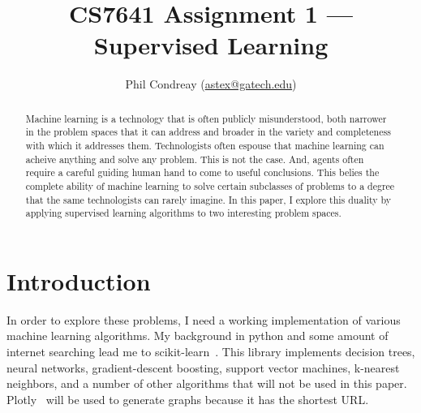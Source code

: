 \documentclass{article}
\title{CS7641 Assignment 1 --- Supervised Learning}
\author{Phil Condreay (\href{mailto:astex@gatech.edu}{astex@gatech.edu})}
\begin{document}
  \maketitle

  \begin{abstract}

    Machine learning is a technology that is often publicly misunderstood,
    both narrower in the problem spaces that it can address and broader in the
    variety and completeness with which it addresses them. Technologists often
    espouse that machine learning can acheive anything and solve any problem.
    This is not the case. And, agents often require a careful guiding human
    hand to come to useful conclusions. This belies the complete ability of
    machine learning to solve certain subclasses of problems to a degree that
    the same technologists can rarely imagine. In this paper, I explore this
    duality by applying supervised learning algorithms to two interesting
    problem spaces.

  \end{abstract}

  \section*{Introduction}\label{s:intro}

  In order to explore these problems, I need a working implementation of
  various machine learning algorithms. My background in python and some amount
  of internet searching lead me to scikit-learn~\cite{scikit-learn}. This
  library implements decision trees, neural networks, gradient-descent
  boosting, support vector machines, k-nearest neighbors, and a number of other
  algorithms that will not be used in this paper. Plotly~\cite{plotly} will be
  used to generate graphs because it has the shortest URL.\

  \printbibliography{}
\end{document}
